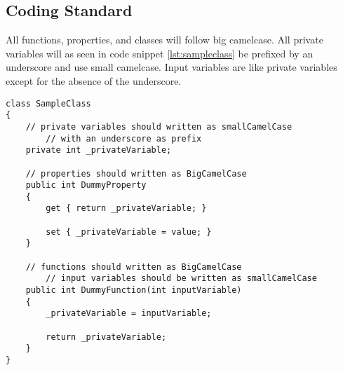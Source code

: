 \subsection{Coding Standard}
\label{subsec:coding_standard}
All functions, properties, and classes will follow big camelcase.
All private variables will as seen in code snippet \ref{lst:sampleclass} be prefixed by an underscore and use small camelcase.
Input variables are like private variables except for the absence of the underscore.

\begin{lstlisting}[style=sourceCode, caption=\myCaption{SampleClass.cs}, label=lst:sampleclass]
class SampleClass
{
    // private variables should written as smallCamelCase
		// with an underscore as prefix
    private int _privateVariable;

    // properties should written as BigCamelCase
    public int DummyProperty
    {
        get { return _privateVariable; }
				
        set { _privateVariable = value; }
    }

    // functions should written as BigCamelCase
		// input variables should be written as smallCamelCase
    public int DummyFunction(int inputVariable)
    {
        _privateVariable = inputVariable;

        return _privateVariable;
    }
}
\end{lstlisting}